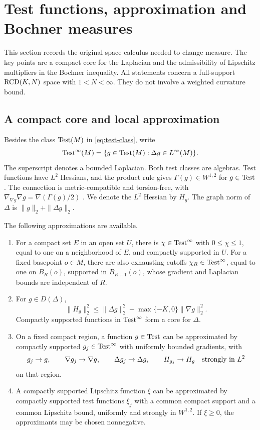 \section{Test functions, approximation and Bochner measures}
\label{sec:preliminaries}

This section records the original-space calculus needed to change
measure. The key points are a compact core for the Laplacian and the
admissibility of Lipschitz multipliers in the Bochner inequality.
All statements concern a full-support \(\mathrm{RCD}(K,N)\) space with
\(1<N<\infty\). They do not involve a weighted curvature bound.

\subsection{A compact core and local approximation}

Besides the class \(\operatorname{Test}(M)\) in \eqref{eq:test-class}, write
\[
\operatorname{Test}^\infty(M)=\{g\in\operatorname{Test}(M):\Delta g\in L^\infty(M)\}.
\]
The superscript denotes a bounded Laplacian. Both test classes are
algebras. Test functions have \(L^2\) Hessians, and the product rule
gives \(\Gamma(g)\in W^{1,2}\) for \(g\in\operatorname{Test}\).
The connection is metric-compatible and torsion-free, with
\(\nabla_{\nabla g}\nabla g=\nabla(\Gamma(g)/2)\)
\cite{Gigli2018,Savare2014}. We denote the \(L^2\) Hessian by
\(H_g\). The graph norm of \(\Delta\) is
\(\|g\|_2+\|\Delta g\|_2\).

\begin{lemma}
\label{pre:approximation}
The following approximations are available.
\begin{enumerate}
\item For a compact set \(E\) in an open set \(U\), there is
\(\chi\in\operatorname{Test}^\infty\) with \(0\le\chi\le1\), equal to one on a
neighborhood of \(E\), and compactly supported in \(U\).
For a fixed basepoint \(o\in M\), there are also exhausting
cutoffs \(\chi_R\in\operatorname{Test}^\infty\),
equal to one on \(B_R(o)\), supported in \(B_{R+1}(o)\), whose
gradient and Laplacian bounds are independent of \(R\).
\item For \(g\in D(\Delta)\),
\begin{equation}
\label{eq:pre-hessian-estimate}
\|H_g\|_2^2\le
\|\Delta g\|_2^2+\max\{-K,0\}\|\nabla g\|_2^2.
\end{equation}
Compactly supported functions in \(\operatorname{Test}^\infty\) form a core
for \(\Delta\).
\item On a fixed compact region, a function \(g\in\operatorname{Test}\) can be
approximated by compactly supported \(g_j\in\operatorname{Test}^\infty\) with
uniformly bounded gradients, with
\[
g_j\to g,\qquad \nabla g_j\to\nabla g,\qquad
\Delta g_j\to\Delta g,\qquad H_{g_j}\to H_g
\quad\hbox{strongly in }L^2
\]
on that region.
\item A compactly supported Lipschitz function \(\xi\) can be
approximated by compactly supported test functions \(\xi_j\)
with a common compact support and a common Lipschitz bound,
uniformly and strongly in \(W^{1,2}\).
If \(\xi\ge0\), the approximants may be chosen nonnegative.
\end{enumerate}
\end{lemma}

